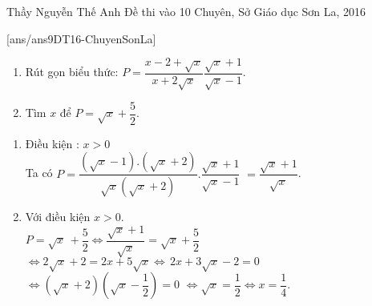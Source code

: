 \begin{name}
{Thầy Nguyễn Thế Anh}
{Đề thi vào 10 Chuyên, Sở Giáo dục Sơn La, 2016}
\end{name}
\setcounter{ex}{0}
[ans/ans9DT16-ChuyenSonLa]
\begin{ex}%
    \hfill
    \begin{enumerate}
        \item  Rút gọn biểu thức:  $P=\dfrac{x-2+\sqrt{x}}{x+2\sqrt{x}} \dfrac{\sqrt{x}+1}{\sqrt{x}-1}.$
        \item  Tìm $x$ để  $P=\sqrt{x}+\dfrac{5}{2}$.
    \end{enumerate}
\loigiai
    {
    \begin{enumerate}
        \item Điều kiện : $x > 0$\\
 Ta có $P=\dfrac{(\sqrt{x}-1).(\sqrt{x}+2)}{\sqrt{x}(\sqrt{x}+2)}.\dfrac{\sqrt{x}+1}{\sqrt{x}-1}$
      $=\dfrac{\sqrt{x}+1}{\sqrt{x}}$.
        \item Với điều kiện $x > 0$.\\
$P=\sqrt{x}\,+\dfrac{5}{2}\Leftrightarrow \dfrac{\sqrt{x}+1}{\sqrt{x}}=\sqrt{x}+\dfrac{5}{2}$\\
$\Leftrightarrow 2\sqrt{x}+2=2x+5\sqrt{x}\Leftrightarrow \,2x+3\sqrt{x}-2=0$\\
$\Leftrightarrow (\sqrt{x}+2)(\sqrt{x}-\dfrac{1}{2})=0$ $\Leftrightarrow \sqrt{x}=\dfrac{1}{2}\Leftrightarrow x=\dfrac{1}{4}$.
    \end{enumerate}
    }
\end{ex}
